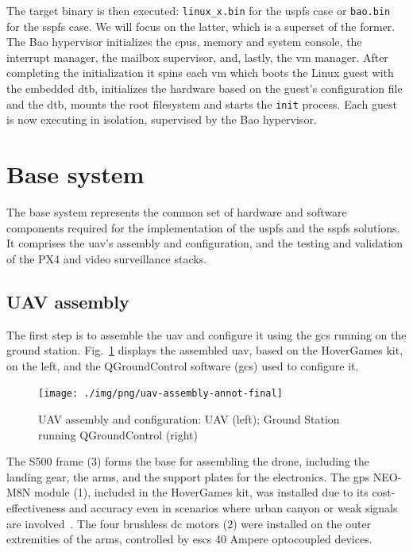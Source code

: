 The target binary is then executed: \texttt{linux\_x.bin} for the \gls{uspfs}
case or \texttt{bao.bin} for the \gls{sspfs} case. We will focus on the latter,
which is a superset of the former. The Bao hypervisor initializes the
\glspl{cpu}, memory and system console, the interrupt manager, the mailbox
supervisor, and, lastly, the \gls{vm} manager. After completing the
initialization it spins each \gls{vm} which boots the Linux guest with the
embedded \gls{dtb}, initializes the hardware based on the guest's configuration
file and the \gls{dtb}, mounts the root filesystem and starts the \texttt{init}
process. Each guest is now executing in isolation, supervised by the Bao
hypervisor.

\section{Base system}
\label{sec:base-system}
The base system represents the common set of hardware and software components
required for the implementation of the \gls{uspfs} and the \gls{sspfs}
solutions. It comprises the \gls{uav}'s assembly and configuration, and the testing and
validation of the PX4 and video surveillance stacks.

\subsection{UAV assembly}
\label{sec:uav-assembly}
The first step is to assemble the \gls{uav} and configure it using the \gls{gcs}
running on the ground station. Fig.~\ref{fig:uav-assembly} displays the
assembled \gls{uav}, based on the HoverGames kit, on the left, and the QGroundControl software (\gls{gcs})
used to configure it. 

\begin{figure}[!hbt]
  \centering
  \texttt{[image: ./img/png/uav-assembly-annot-final]} 
  \caption[UAV assembly and configuration]{UAV assembly and configuration: UAV
    (left); Ground Station running QGroundControl (right)}%
  \label{fig:uav-assembly}
\end{figure}

The S500 frame (3) forms the base for assembling the drone, including the
landing gear, the arms, and the support plates for the electronics.
The \gls{gps} NEO-M8N module (1), included in the HoverGames kit, was installed due to its
cost-effectiveness and accuracy even in scenarios where urban canyon or weak
signals are involved~\cite{gps-neom8n-product}. The four brushless \gls{dc}
motors (2) were installed on the outer extremities of the arms, controlled by
\glspl{esc} 40 Ampere optocoupled devices. 

